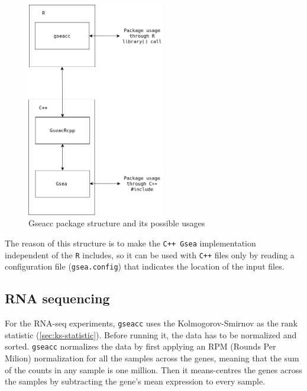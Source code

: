 \documentclass[aps,prb,twocolumn,superscriptaddress,floatfix,longbibliography]{revtex4-2}
\newif\ifptitle
\newif\ifpnumber
\newcounter{para}
\newcommand\ptitle[1]{\par\refstepcounter{para}
{\ifpnumber{\noindent\textcolor{lightgray}{\textbf{\thepara}}\indent}\fi}
{\ifptitle{\textbf{[{#1}]}}\fi}}
\begin{document}
\begin{figure}[h]
\centering
\includegraphics[clip=true,width=6cm]{img/gseacc-structure.png}
\caption{Gseacc package structure and its possible usages}
\label{fig:gseacc-structure}
\end{figure}

The reason of this structure is to make the \texttt{C++ Gsea} implementation independent of the \texttt{R} includes, so it can be used with \texttt{C++} files only by reading a configuration file (\texttt{gsea.config}) that indicates the location of the input files.

\subsection{RNA sequencing}

\ptitle{gseacc} For the RNA-seq experiments, \texttt{gseacc} uses the Kolmogorov-Smirnov as the rank statistic (\ref{sec:ks-statistic}). Before running it, the data has to be normalized and sorted. \texttt{gseacc} normalizes the data by first applying an RPM (Rounds Per Milion) normalization for all the samples across the genes, meaning that the sum of the counts in any sample is one million. Then it means-centres the genes across the samples by subtracting the gene's mean expression to every sample.
\end{document}
